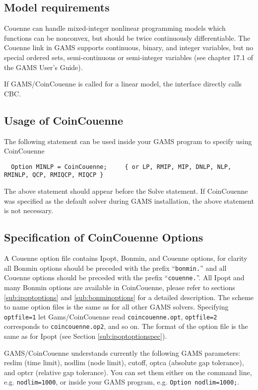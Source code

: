 \subsection{Model requirements}

Couenne can handle mixed-integer nonlinear programming models which functions can be nonconvex, but should be twice continuously differentiable.
The Couenne link in GAMS supports continuous, binary, and integer variables, but no special ordered sets, semi-continuous or semi-integer variables (see chapter 17.1 of the GAMS User's Guide).

If GAMS/CoinCouenne is called for a linear model, the interface directly calls CBC.

\subsection{Usage of CoinCouenne}

The following statement can be used inside your GAMS program to specify using CoinCouenne
\begin{verbatim}
  Option MINLP = CoinCouenne;     { or LP, RMIP, MIP, DNLP, NLP, RMINLP, QCP, RMIQCP, MIQCP }
\end{verbatim}

The above statement should appear before the Solve statement.
If CoinCouenne was specified as the default solver during GAMS installation, the above statement is not necessary.

\subsection{Specification of CoinCouenne Options}
\label{sub:couenneoptionspec}

A Couenne option file contains Ipopt, Bonmin, and Couenne options, for clarity all Bonmin options should be preceded with the prefix ``\texttt{bonmin.}'' and all Couenne options should be preceded with the prefix ``\texttt{couenne.}''.
All Ipopt and many Bonmin options are available in CoinCouenne, please refer to sections \ref{sub:ipoptoptions} and \ref{sub:bonminoptions} for a detailed description.
The scheme to name option files is the same as for all other GAMS solvers.
Specifying \texttt{optfile=1} let Gams/CoinCouenne read \texttt{coincouenne.opt}, \texttt{optfile=2} corresponds to \texttt{coincouenne.op2}, and so on.
The format of the option file is the same as for Ipopt (see Section \ref{sub:ipoptoptionspec}).

GAMS/CoinCouenne understands currently the following GAMS parameters: reslim (time limit), nodlim (node limit), cutoff, optca (absolute gap tolerance), and optcr (relative gap tolerance).
You can set them either on the command line, e.g. \verb+nodlim=1000+, or inside your GAMS program, e.g. \verb+Option nodlim=1000;+.


